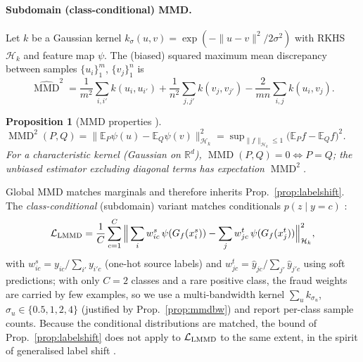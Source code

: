 \documentclass[journal]{IEEEtran}
\newtheorem{proposition}{Proposition}
\newcommand{\R}{\mathbb{R}}
\newcommand{\E}{\mathbb{E}}
\newcommand{\1}{\mathbf{1}}
\DeclareMathOperator{\MMD}{MMD}
\begin{document}
\paragraph{Subdomain (class-conditional) MMD.} Let $k$ be a Gaussian kernel $k_\sigma(u,v)=\exp(-\|u-v\|^2/2\sigma^2)$ with RKHS $\mathcal H_k$ and feature map $\psi$. The (biased) squared maximum mean discrepancy between samples $\{u_i\}_1^{m}$, $\{v_j\}_1^{n}$ is
\begin{equation}
\widehat{\MMD}^2=\frac1{m^2}\!\sum_{i,i'}\!k(u_i,u_{i'})+\frac1{n^2}\!\sum_{j,j'}\!k(v_j,v_{j'})-\frac2{mn}\!\sum_{i,j}\!k(u_i,v_j).
\end{equation}
\begin{proposition}[MMD properties \cite{gretton2012kernel}]\label{prop:mmd}
$\MMD^2(P,Q)=\|\E_P\psi(u)-\E_Q\psi(v)\|_{\mathcal H_k}^2=\sup_{\|f\|_{\mathcal H_k}\le1}\big(\E_Pf-\E_Qf\big)^2$. For a characteristic kernel (Gaussian on $\R^d$), $\MMD(P,Q)=0\iff P=Q$; the unbiased estimator excluding diagonal terms has expectation $\MMD^2$.
\end{proposition}
Global MMD \cite{long2015dan} matches marginals and therefore inherits Prop.~\ref{prop:labelshift}. The \emph{class-conditional} (subdomain) variant matches conditionals $p(z\mid y=c)$ \cite{zhu2021dsan}:
\begin{equation}
\mathcal L_{\rm LMMD}=\frac1C\sum_{c=1}^{C}\Big\|\sum_{i}w^{s}_{ic}\,\psi(G_f(x^s_i))-\sum_{j}w^{t}_{jc}\,\psi(G_f(x^t_j))\Big\|^2_{\mathcal H_k},
\end{equation}
with $w^s_{ic}=y_{ic}/\sum_{i'}y_{i'c}$ (one-hot source labels) and $w^t_{jc}=\hat y_{jc}/\sum_{j'}\hat y_{j'c}$ using soft predictions; with only $C=2$ classes and a rare positive class, the fraud weights are carried by few examples, so we use a multi-bandwidth kernel $\sum_{u}k_{\sigma_u}$, $\sigma_u\in\{0.5,1,2,4\}$ (justified by Prop.~\ref{prop:mmdbw}) and report per-class sample counts. Because the conditional distributions are matched, the bound of Prop.~\ref{prop:labelshift} does not apply to $\mathcal L_{\rm LMMD}$ to the same extent, in the spirit of generalised label shift \cite{tachet2020gls}.
\end{document}
